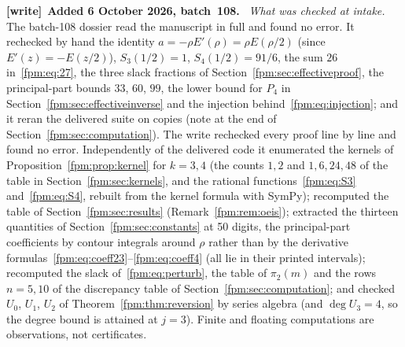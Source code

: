 \documentclass[11pt]{article}
\theoremstyle{definition}\newtheorem{definition}[theorem]{Definition}
\theoremstyle{remark}\newtheorem{remark}[theorem]{Remark}
\newenvironment{writenote}[1][]{\par\smallskip\begingroup\small
 \noindent\textbf{[write]}\if\relax\detokenize{#1}\relax\else~\textbf{#1.}\fi\ }%
 {\par\endgroup\smallskip}
\begin{document}
\begin{writenote}[Added 6 October 2026, batch~108]
\emph{What was checked at intake.} The batch-108 dossier read the
manuscript in full and found no error. It rechecked by hand the identity
$a=-\rho E'(\rho)=\rho E(\rho/2)$ (since $E'(z)=-E(z/2)$),
$S_3(1/2)=1$, $S_4(1/2)=91/6$, the sum $26$ in~\eqref{fpm:eq:27}, the
three slack fractions of Section~\ref{fpm:sec:effectiveproof}, the
principal-part bounds $33$, $60$, $99$, the lower bound for $P_4$ in
Section~\ref{fpm:sec:effectiveinverse} and the injection
behind~\eqref{fpm:eq:injection}; and it reran the delivered suite on copies
(note at the end of Section~\ref{fpm:sec:computation}). The write
rechecked every proof line by line and found no error. Independently of
the delivered code it enumerated the kernels of
Proposition~\ref{fpm:prop:kernel} for $k=3,4$ (the counts $1,2$ and
$1,6,24,48$ of the table in Section~\ref{fpm:sec:kernels}, and the rational
functions~\eqref{fpm:eq:S3} and~\eqref{fpm:eq:S4}, rebuilt from the kernel
formula with SymPy); recomputed the table of Section~\ref{fpm:sec:results}
(Remark~\ref{fpm:rem:oeis}); extracted the thirteen quantities of
Section~\ref{fpm:sec:constants} at 50 digits, the principal-part
coefficients by contour integrals around $\rho$ rather than by the
derivative formulas~\eqref{fpm:eq:coeff23}--\eqref{fpm:eq:coeff4} (all lie
in their printed intervals); recomputed the slack
of~\eqref{fpm:eq:perturb}, the table of $\pi_2(m)$ and the rows $n=5,10$ of
the discrepancy table of Section~\ref{fpm:sec:computation}; and checked
$U_0$, $U_1$, $U_2$ of Theorem~\ref{fpm:thm:reversion} by series algebra
(and $\deg U_3=4$, so the degree bound is attained at $j=3$). Finite and
floating computations are observations, not certificates.


\end{writenote}
\end{document}
